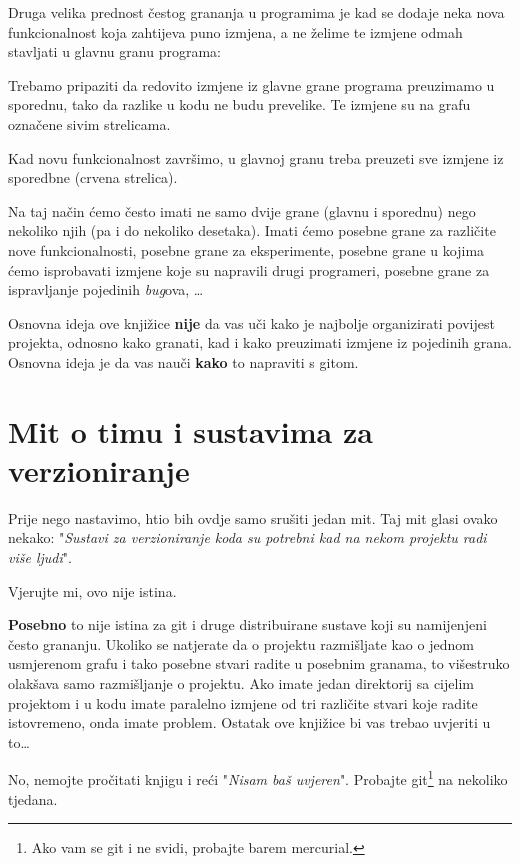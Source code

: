 Druga velika prednost čestog grananja u programima je kad se dodaje neka nova funkcionalnost koja zahtijeva puno izmjena, a ne želime te izmjene odmah stavljati u glavnu granu programa:



Trebamo pripaziti da redovito izmjene iz glavne grane programa preuzimamo u sporednu, tako da razlike u kodu ne budu prevelike. 
Te izmjene su na grafu označene sivim strelicama.

Kad novu funkcionalnost završimo, u glavnoj granu treba preuzeti sve izmjene iz sporedbne (crvena strelica).

Na taj način ćemo često imati ne samo dvije grane (glavnu i sporednu) nego nekoliko njih (pa i do nekoliko desetaka). 
Imati ćemo posebne grane za različite nove funkcionalnosti, posebne grane za eksperimente, posebne grane u kojima ćemo isprobavati izmjene koje su napravili drugi programeri, posebne grane za ispravljanje pojedinih \emph{bug}ova, \dots

Osnovna ideja ove knjižice \textbf{nije} da vas uči kako je najbolje organizirati povijest projekta, odnosno kako granati, kad i kako preuzimati izmjene iz pojedinih grana. Osnovna ideja je da vas nauči \textbf{kako} to napraviti s gitom. 

\section*{Mit o timu i sustavima za verzioniranje}

Prije nego nastavimo, htio bih ovdje samo srušiti jedan mit. 
Taj mit glasi ovako nekako: "\emph{Sustavi za verzioniranje koda su potrebni kad na nekom projektu radi više ljudi}".

Vjerujte mi, ovo nije istina.

\textbf{Posebno} to nije istina za git i druge distribuirane sustave koji su namijenjeni često grananju.
Ukoliko se natjerate da o projektu razmišljate kao o jednom usmjerenom grafu i tako posebne stvari radite u posebnim granama, to višestruko olakšava samo razmišljanje o projektu.
Ako imate jedan direktorij sa cijelim projektom i u kodu imate paralelno izmjene od tri različite stvari koje radite istovremeno, onda imate problem.
Ostatak ove knjižice bi vas trebao uvjeriti u to\dots

No, nemojte pročitati knjigu i reći "\emph{Nisam baš uvjeren}". 
Probajte git\footnote{Ako vam se git i ne svidi, probajte barem mercurial.} na nekoliko tjedana.

